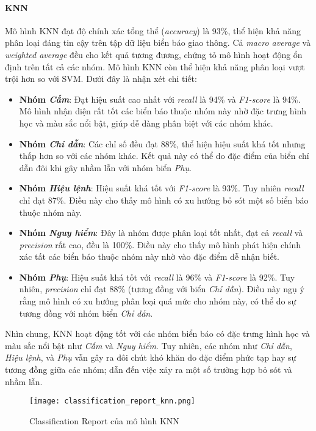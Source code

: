\documentclass[a4paper,12pt]{article}
\begin{document}
\paragraph{KNN}  
Mô hình KNN đạt độ chính xác tổng thể (\textit{accuracy}) là 93\%, thể hiện khả năng phân loại đáng tin cậy trên tập dữ liệu biển báo giao thông. Cả \textit{macro average} và \textit{weighted average} đều cho kết quả tương đương, chứng tỏ mô hình hoạt động ổn định trên tất cả các nhóm. Mô hình KNN còn thể hiện khả năng phân loại vượt trội hơn so với SVM. Dưới đây là nhận xét chi tiết:
\begin{itemize}
    \item \textbf{Nhóm \textit{Cấm}}: Đạt hiệu suất cao nhất với \textit{recall} là 94\% và \textit{F1-score} là 94\%. Mô hình nhận diện rất tốt các biển báo thuộc nhóm này nhờ đặc trưng hình học và màu sắc nổi bật, giúp dễ dàng phân biệt với các nhóm khác.  
    \item \textbf{Nhóm \textit{Chỉ dẫn}}: Các chỉ số đều đạt 88\%, thể hiện hiệu suất khá tốt nhưng thấp hơn so với các nhóm khác. Kết quả này có thể do đặc điểm của biển chỉ dẫn đôi khi gây nhầm lẫn với nhóm biển \textit{Phụ}.
    \item \textbf{Nhóm \textit{Hiệu lệnh}}: Hiệu suất khá tốt với \textit{F1-score} là 93\%. Tuy nhiên \textit{recall} chỉ đạt 87\%. Điều này cho thấy mô hình có xu hướng bỏ sót một số biển báo thuộc nhóm này.
    \item \textbf{Nhóm \textit{Nguy hiểm}}: Đây là nhóm được phân loại tốt nhất, đạt cả \textit{recall} và \textit{precision} rất cao, đều là 100\%. Điều này cho thấy mô hình phát hiện chính xác tất các biển báo thuộc nhóm này nhờ vào đặc điểm dễ nhận biết. 
    \item \textbf{Nhóm \textit{Phụ}}: Hiệu suất khá tốt với \textit{recall} là 96\% và \textit{F1-score} là 92\%. Tuy nhiên, \textit{precision} chỉ đạt 88\% (tương đồng với biển \textit{Chỉ dẫn}). Điều này ngụ ý rằng mô hình có xu hướng phân loại quá mức cho nhóm này, có thể do sự tương đồng với nhóm biển \textit{Chỉ dẫn}.
\end{itemize}

Nhìn chung, KNN hoạt động tốt với các nhóm biển báo có đặc trưng hình học và màu sắc nổi bật như \textit{Cấm} và \textit{Nguy hiểm}. Tuy nhiên, các nhóm như \textit{Chỉ dẫn}, \textit{Hiệu lệnh}, và \textit{Phụ} vẫn gây ra đôi chút khó khăn do đặc điểm phức tạp hay sự tương đồng giữa các nhóm; dẫn đến việc xảy ra một số trường hợp bỏ sót và nhầm lẫn.

\begin{figure}[H]
    \centering
    \texttt{[image: classification\_report\_knn.png]}
    \caption{Classification Report của mô hình KNN}
    \label{fig:knn_classification_report}
\end{figure}
\end{document}
